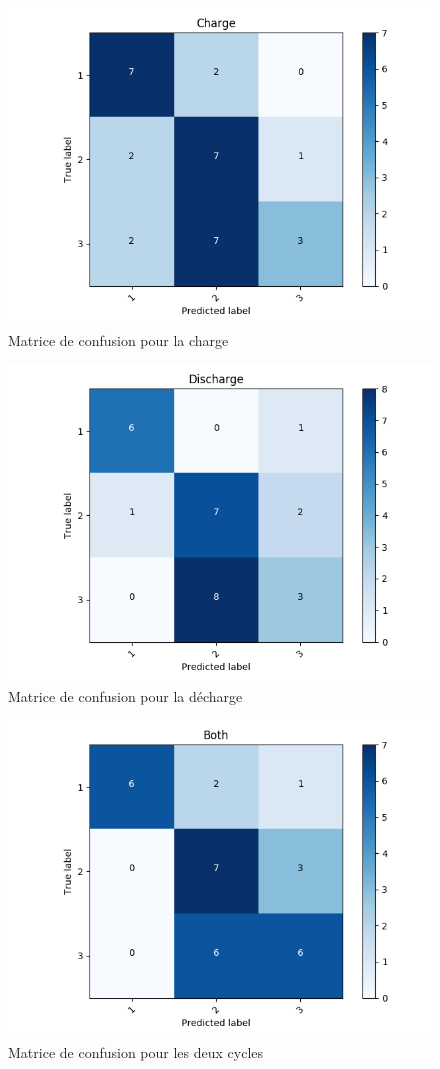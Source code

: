 \begin{figure}
    \centering
    \includegraphics[scale=0.5]{images/Confcha.png}
    \caption{Matrice de confusion pour la charge}
    \label{fig:HMMconfCha}
\end{figure}

\begin{figure}
    \centering
    \includegraphics[scale=0.5]{images/Confdech.png}
    \caption{Matrice de confusion pour la décharge}
    \label{fig:HMMconfDecha}
\end{figure}

\begin{figure}
    \centering
    \includegraphics[scale=0.5]{images/Confboth.png}
    \caption{Matrice de confusion pour les deux cycles}
    \label{fig:HMMconfboth}
\end{figure}